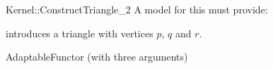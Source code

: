\begin{ccRefFunctionObjectConcept}{Kernel::ConstructTriangle_2}
A model for this must provide:


            {introduces a triangle  with vertices $p$,  $q$ and $r$.}

\ccRefines
AdaptableFunctor (with three arguments)

\ccSeeAlso
{}\\

\end{ccRefFunctionObjectConcept}
